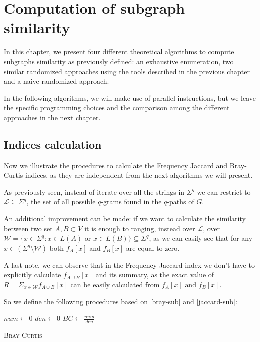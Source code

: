 \chapter{Computation of subgraph similarity}

In this chapter, we present four different theoretical algorithms to compute subgraphs similarity as previously defined: an exhaustive enumeration, two similar randomized approaches using the tools described in the previous chapter and a naive randomized approach.\medskip
	
In the following algorithms, we will make use of parallel instructions, but we leave the specific programming choices and the comparison among the different approaches in the next chapter.
	
\section{Indices calculation}

Now we illustrate the procedures to calculate the Frequency Jaccard and Bray-Curtis indices, as they are independent from the next algorithms we will present.\bigskip

As previously seen, instead of iterate over all the strings in $\Sigma^{q}$ we can restrict to $\mathcal{L} \subseteq \Sigma^{q}$, the set of all possible $q$-grams found in the $q$-paths of $G$.\medskip 

An additional improvement can be made: if we want to calculate the similarity between two set $A, B \subset V$ it is enough to ranging, instead over $\mathcal{L}$, over $\mathcal{W} = \{ x \in \Sigma^{q} : x \in L(A) \text{ or } x \in L(B) \} \subseteq \Sigma^{q}$, as we can easily see that for any $x \in ( \Sigma^{q} \setminus \mathcal{W} )$ both $f_A[x]$ and $f_B[x]$ are equal to zero.\bigskip

A last note, we can observe that in the Frequency Jaccard index we don't have to explicitly calculate $f_{A \cup B}[x]$ and its summary, as the exact value of $R = \Sigma_{x \in \mathcal{W}} f_{A \cup B}[x]$ can be easily calculated from $f_{A}[x] \text{ and } f_{B}[x]$.\bigskip

So we define the following procedures based on \eqref{bray-sub} and \eqref{jaccard-sub}:\medskip

\begin{algorithm}[h]
	\small
	\DontPrintSemicolon
	\BlankLine
	$num \gets 0$\;
	$den \gets 0$\;
	$BC \gets \frac{num}{den}$\;
	\caption{\textsc{Bray-Curtis}}
	\label{alg:bray-curtis}
\end{algorithm}

